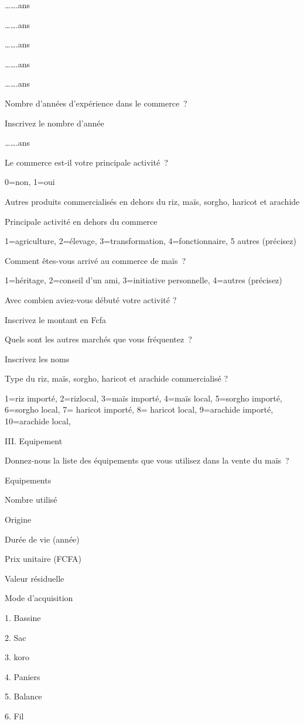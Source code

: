 \documentclass[12pt,oneside]{report}
\begin{document}
…….ans

…….ans

…….ans

…….ans

…….ans

Nombre d’années d’expérience dans le commerce ?

Inscrivez le nombre d’année

…….ans

Le commerce est-il votre principale activité ?

0=non, 1=oui

Autres produits commercialisés en dehors du riz, maïs, sorgho, haricot et arachide

Principale activité en dehors du commerce

1=agriculture, 2=élevage, 3=transformation, 4=fonctionnaire, 5 autres (précisez)

Comment êtes-vous arrivé au commerce de maïs ?

1=héritage, 2=conseil d’un ami, 3=initiative personnelle, 4=autres (précisez)

Avec combien aviez-vous débuté votre activité ?

Inscrivez le montant en Fcfa

Quels sont les autres marchés que vous fréquentez ?

Inscrivez les noms

Type du riz, maïs, sorgho, haricot et arachide commercialisé ?

1=riz importé, 2=rizlocal, 3=maïs importé, 4=maïs local, 5=sorgho importé, 6=sorgho local, 7= haricot importé, 8= haricot local, 9=arachide  importé, 10=arachide local,

III. Equipement

Donnez-nous la liste des équipements que vous utilisez dans la vente  du maïs ?

Equipements

Nombre utilisé

Origine

Durée de vie (année)

Prix unitaire (FCFA)

Valeur résiduelle

Mode d’acquisition

1. Bassine

2. Sac

3. koro

4. Paniers

5. Balance

6. Fil
\end{document}
